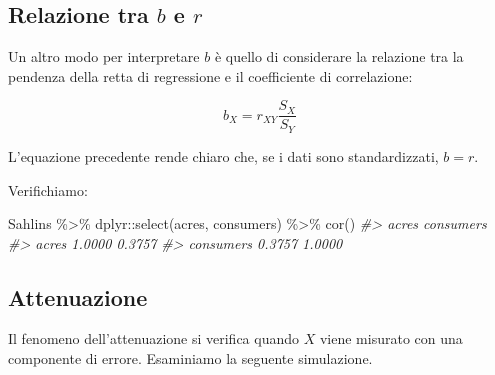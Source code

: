 \documentclass[
  11pt,
]{krantz}
\makeatletter
\newenvironment{Shaded}{\begin{snugshade}}{\end{snugshade}}
\newcommand{\AttributeTok}[1]{\textcolor[rgb]{0.61,0.61,0.61}{#1}}
\newcommand{\CommentTok}[1]{\textcolor[rgb]{0.37,0.37,0.37}{\textit{#1}}}
\newcommand{\FunctionTok}[1]{\textcolor[rgb]{0,0,0}{#1}}
\newcommand{\NormalTok}[1]{#1}
\newcommand{\OtherTok}[1]{\textcolor[rgb]{0.37,0.37,0.37}{#1}}
\newcommand{\SpecialCharTok}[1]{\textcolor[rgb]{0,0,0}{#1}}
\newenvironment{kframe}{%
\medskip{}
\setlength{\fboxsep}{.8em}
 \def\at@end@of@kframe{}%
 \ifinner\ifhmode%
  \def\at@end@of@kframe{\end{minipage}}%
  \begin{minipage}{\columnwidth}%
 \fi\fi%
 \def\FrameCommand##1{\hskip\@totalleftmargin \hskip-\fboxsep
 \colorbox{shadecolor}{##1}\hskip-\fboxsep
     \hskip-\linewidth \hskip-\@totalleftmargin \hskip\columnwidth}%
 \MakeFramed {\advance\hsize-\width
   \@totalleftmargin\z@ \linewidth\hsize
   \@setminipage}}%
 {\par\unskip\endMakeFramed%
 \at@end@of@kframe}
\renewenvironment{Shaded}{\begin{kframe}}{\end{kframe}}
\makeatother
\begin{document}
\hypertarget{relazione-tra-b-e-r}{%
\subsection{\texorpdfstring{Relazione tra \(b\) e \(r\)}{Relazione tra b e r}}\label{relazione-tra-b-e-r}}

Un altro modo per interpretare \(b\) è quello di considerare la relazione tra la pendenza della retta di regressione e il coefficiente di correlazione:

\[
b_X = r_{XY} \frac{S_X}{S_Y}
\]

L'equazione precedente rende chiaro che, se i dati sono standardizzati, \(b = r\).

Verifichiamo:

\begin{Shaded}
\begin{Highlighting}[]
\NormalTok{Sahlins }\SpecialCharTok{\%\textgreater{}\%}
\NormalTok{  dplyr}\SpecialCharTok{::}\FunctionTok{select}\NormalTok{(acres, consumers) }\SpecialCharTok{\%\textgreater{}\%}
  \FunctionTok{cor}\NormalTok{()}
\CommentTok{\#\textgreater{}            acres consumers}
\CommentTok{\#\textgreater{} acres     1.0000    0.3757}
\CommentTok{\#\textgreater{} consumers 0.3757    1.0000}
\end{Highlighting}
\end{Shaded}

\begin{Shaded}
\end{Shaded}

\hypertarget{attenuazione}{%
\subsection{Attenuazione}\label{attenuazione}}

Il fenomeno dell'attenuazione si verifica quando \(X\) viene misurato con una componente di errore. Esaminiamo la seguente simulazione.
\end{document}
